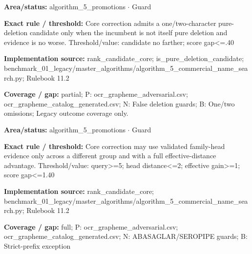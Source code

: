 \begin{tcolorbox}[enhanced,breakable,colback=white,colframe=Muted!45,boxrule=0.45pt,arc=1.5pt,left=6pt,right=6pt,top=5pt,bottom=5pt,title={\texttt{A5-CORE-PURE-DELETION-17B}},title after break={\texttt{A5-CORE-PURE-DELETION-17B}\ (continued)},fonttitle=\headingfont\bfseries\color{Navy},coltitle=Navy]
\textbf{Area/status:} algorithm\_\allowbreak{}5\_\allowbreak{}promotions $\boldsymbol{\cdot}$ Guard\par
\smallskip
\textbf{Exact rule / threshold:} Core correction admits a one/\allowbreak{}two-character pure-deletion candidate only when the incumbent is not itself pure deletion and evidence is no worse. Threshold/\allowbreak{}value: candidate no farther; score gap<=.40\par
\smallskip
\textbf{Implementation source:} rank\_\allowbreak{}candidate\_\allowbreak{}core; is\_\allowbreak{}pure\_\allowbreak{}deletion\_\allowbreak{}candidate; benchmark\_\allowbreak{}01\_\allowbreak{}legacy/\allowbreak{}master\_\allowbreak{}algorithms/\allowbreak{}algorithm\_\allowbreak{}5\_\allowbreak{}commercial\_\allowbreak{}name\_\allowbreak{}search.py; Rulebook 11.2\par
\smallskip
\textbf{Coverage / gap:} partial; P: ocr\_\allowbreak{}grapheme\_\allowbreak{}adversarial.csv; ocr\_\allowbreak{}grapheme\_\allowbreak{}catalog\_\allowbreak{}generated.csv; N: False deletion guards; B: One/\allowbreak{}two omissions; Legacy outcome coverage only.
\end{tcolorbox}
\begin{tcolorbox}[enhanced,breakable,colback=white,colframe=Muted!45,boxrule=0.45pt,arc=1.5pt,left=6pt,right=6pt,top=5pt,bottom=5pt,title={\texttt{A5-CORE-VARIANT-HEAD-17D}},title after break={\texttt{A5-CORE-VARIANT-HEAD-17D}\ (continued)},fonttitle=\headingfont\bfseries\color{Navy},coltitle=Navy]
\textbf{Area/status:} algorithm\_\allowbreak{}5\_\allowbreak{}promotions $\boldsymbol{\cdot}$ Guard\par
\smallskip
\textbf{Exact rule / threshold:} Core correction may use validated family-head evidence only across a different group and with a full effective-distance advantage. Threshold/\allowbreak{}value: query>=5; head distance<=2; effective gain>=1; score gap<=1.40\par
\smallskip
\textbf{Implementation source:} rank\_\allowbreak{}candidate\_\allowbreak{}core; benchmark\_\allowbreak{}01\_\allowbreak{}legacy/\allowbreak{}master\_\allowbreak{}algorithms/\allowbreak{}algorithm\_\allowbreak{}5\_\allowbreak{}commercial\_\allowbreak{}name\_\allowbreak{}search.py; Rulebook 11.2\par
\smallskip
\textbf{Coverage / gap:} full; P: ocr\_\allowbreak{}grapheme\_\allowbreak{}adversarial.csv; ocr\_\allowbreak{}grapheme\_\allowbreak{}catalog\_\allowbreak{}generated.csv; N: ABASAGLAR/\allowbreak{}SEROPIPE guards; B: Strict-prefix exception
\end{tcolorbox}
